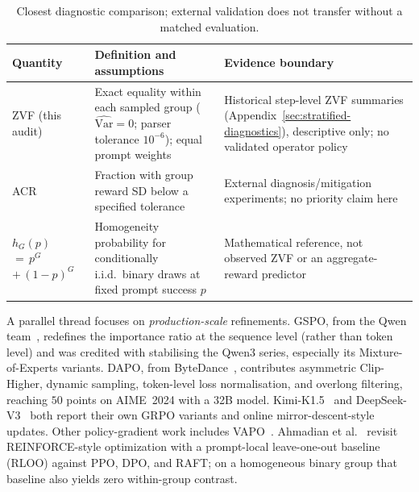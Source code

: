 \begin{table}[htbp]
\centering\small
\caption{Closest diagnostic comparison; external validation does not transfer
without a matched evaluation.}
\label{tab:diagnostic-prior}
\begin{tabular}{p{.17\linewidth}p{.34\linewidth}p{.38\linewidth}}
\toprule
Quantity & Definition and assumptions & Evidence boundary \\
\midrule
ZVF (this audit) & Exact equality within each sampled group ($\widehat{\mathrm{Var}}{=}0$; parser tolerance $10^{-6}$); equal prompt weights & Historical step-level ZVF summaries (Appendix~\ref{sec:stratified-diagnostics}), descriptive only; no validated operator policy \\
ACR~\citep{he2026advantage} & Fraction with group reward SD below a specified tolerance & External diagnosis/mitigation experiments; no priority claim here \\
$h_G(p)$ ${=}\,p^G$ ${+}\,(1{-}p)^G$ & Homogeneity probability for conditionally i.i.d.\ binary draws at fixed prompt success $p$ & Mathematical reference, not observed ZVF or an aggregate-reward predictor \\
\bottomrule
\end{tabular}
\end{table}

A parallel thread focuses on \emph{production-scale} refinements. GSPO, from
the Qwen team~\cite{qwen2025gspo}, redefines the importance ratio at the
sequence level (rather than token level) and was credited with stabilising the
Qwen3 series, especially its Mixture-of-Experts variants. DAPO, from
ByteDance~\cite{yu2025dapo}, contributes asymmetric Clip-Higher, dynamic
sampling, token-level loss normalisation, and overlong filtering, reaching
$50$ points on AIME~2024 with a 32B model. Kimi-K1.5~\cite{team2025kimi15, team2025kimik2} and DeepSeek-V3~\cite{deepseek2024v3} both report their own
GRPO variants and online mirror-descent-style updates. Other policy-gradient work includes VAPO~\cite{bytedance2025vapo}.
Ahmadian et al.~\cite{ahmadian2024backtobasics} revisit REINFORCE-style
optimization with a prompt-local leave-one-out baseline (RLOO) against PPO,
DPO, and RAFT; on a homogeneous binary group that baseline also yields zero
within-group contrast.

